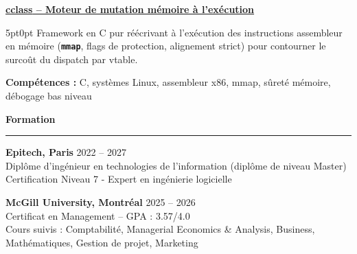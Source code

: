 \documentclass[9pt]{extarticle}
\begin{document}
\par\vspace{8pt}

\underline{\bfseries \href{https://github.com/paulogarithm/cclass}{cclass} -- Moteur de mutation mémoire à l'exécution}
\par
\begin{adjustwidth}{5pt}{0pt}
    Framework en C pur réécrivant à l'exécution des instructions assembleur en mémoire ({\bfseries \texttt{mmap}}, flags de protection, alignement strict) pour contourner le surcoût du dispatch par vtable.
\end{adjustwidth}
{\bfseries Compétences :} C, systèmes Linux, assembleur x86, mmap, sûreté mémoire, débogage bas niveau

\par\vspace{8pt}

{\large\bfseries Formation}
\par\vspace{-8pt}
\rule{\linewidth}{0.4pt}
\par\vspace{5pt}

{\bfseries Epitech, Paris} \hfill 2022 -- 2027 \\
Diplôme d'ingénieur en technologies de l'information (diplôme de niveau Master) \\
Certification Niveau 7 - Expert en ingénierie logicielle

\vspace{6pt}

{\bfseries McGill University, Montréal} \hfill 2025 -- 2026 \\
Certificat en Management -- GPA : 3.57/4.0 \\
Cours suivis : Comptabilité, Managerial Economics \& Analysis, Business, Mathématiques, Gestion de projet, Marketing
\end{document}
